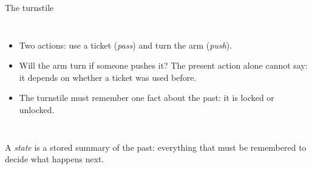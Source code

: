 \documentclass[10pt]{wosm-slides}
\begin{document}
\begin{frame}{The turnstile}
  \begin{columns}[c, totalwidth=\textwidth]
      \begin{itemize}
        \item Two actions: use a ticket (\emph{pass}) and turn the arm
          (\emph{push}).
        \item Will the arm turn if someone pushes it? The present action alone
          cannot say: it depends on whether a ticket was used before.
        \item The turnstile must remember one fact about the past: it is
          \alert{locked} or \alert{unlocked}.
      \end{itemize}
      \centering
  \end{columns}

  \bigskip
  \begin{definition}[State]
    A \emph{state} is a stored summary of the past: everything that must be
    remembered to decide what happens next.
  \end{definition}
\end{frame}
\end{document}
